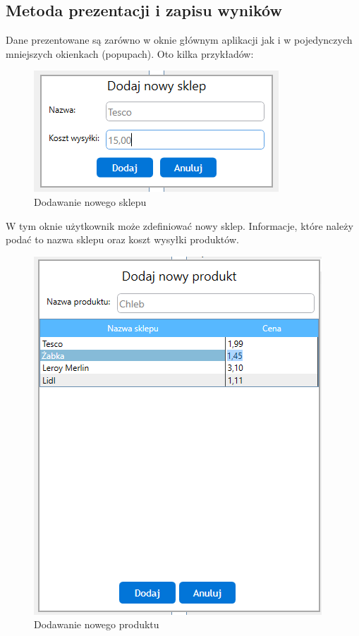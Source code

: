 \documentclass[a4paper]{article}
\begin{document}
\subsection{Metoda prezentacji i zapisu wyników}
Dane prezentowane są zarówno w oknie głównym aplikacji jak i w pojedynczych mniejszych okienkach (popupach). Oto kilka przykładów:
\newline
\begin{figure}[H]
\centering
\includegraphics[scale=1]{img/modal-nowy-sklep.png}
\caption{Dodawanie nowego sklepu}
\end{figure}
\begin{flushleft}
W tym oknie użytkownik może zdefiniować nowy sklep. Informacje, które należy podać to nazwa sklepu oraz koszt wysyłki produktów.
\end{flushleft}
\begin{figure}[H]
\centering
\includegraphics[scale=1]{img/modal-nowy-produkt.png}
\caption{Dodawanie nowego produktu}
\end{figure}
\end{document}

